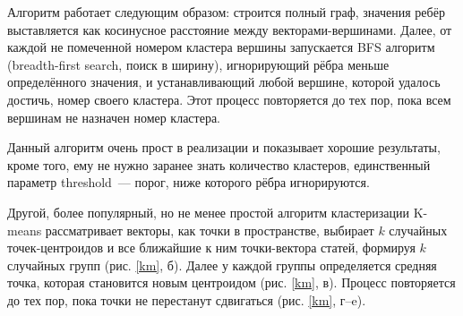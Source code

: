 \documentclass[a4paper, 14pt]{extarticle}
\begin{document}
Алгоритм работает следующим образом: строится полный граф, значения ребёр выставляется как косинусное расстояние между векторами-вершинами. Далее, от каждой не помеченной номером кластера вершины запускается BFS алгоритм (breadth-first search, поиск в ширину), игнорирующий рёбра меньше определённого значения, и устанавливающий любой вершине, которой удалось достичь, номер своего кластера. Этот процесс повторяется до тех пор, пока всем вершинам не назначен номер кластера.

Данный алгоритм очень прост в реализации и показывает хорошие результаты, кроме того, ему не нужно заранее знать количество кластеров, единственный параметр threshold~--- порог, ниже которого рёбра игнорируются.


Другой, более популярный, но не менее простой алгоритм кластеризации K-means рассматривает векторы, как точки в пространстве, выбирает $k$ случайных точек-центроидов и все ближайшие к ним точки-вектора статей, формируя $k$ случайных групп  (рис. \ref{km}, б). Далее у каждой группы определяется средняя точка, которая становится новым центроидом (рис. \ref{km}, в). Процесс повторяется до тех пор, пока точки не перестанут сдвигаться (рис. \ref{km}, г--e).
\end{document}
